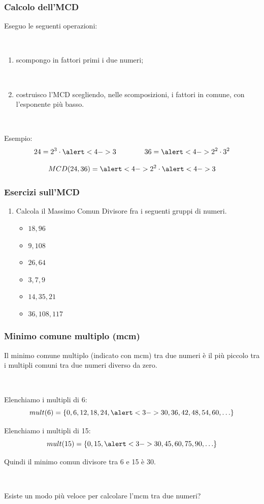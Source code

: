 \documentclass[]{beamer}
\theoremstyle{plain}
\begin{document}
\begin{frame}
\frametitle{Calcolo dell'MCD}
Eseguo le seguenti operazioni:

~

\begin{enumerate}
  \item \alert{scompongo in fattori primi} i due numeri;\pause
  
  ~
  \item costruisco l'MCD scegliendo, nelle scomposizioni, \alert{i fattori in comune, con l'esponente più basso}.\pause
\end{enumerate}

~

Esempio:\[24 = 2^3 \cdot \alert<4->{3} \qquad\qquad 36 = \alert<4->{2^2} \cdot 3^2 \]\pause

\[ MCD(24, 36) = \alert<4->{2^2} \cdot \alert<4->{3} \]
\end{frame}







\begin{frame}
  \frametitle{Esercizi sull'MCD}
  \begin{enumerate}
    \item Calcola il Massimo Comun Divisore fra i seguenti gruppi di numeri.
    \begin{multicols}{2}
      \begin{itemize}
          \item $ 18, 96 $
          \item $ 9, 108 $
          \item $ 26, 64 $
          \item $ 3, 7, 9 $
          \item $ 14, 35, 21 $
          \item $ 36, 108, 117 $
      \end{itemize}
    \end{multicols}
  \end{enumerate}
  \end{frame}
  
  





\begin{frame}
\frametitle{Minimo comune multiplo (mcm)}
Il minimo comune multiplo (indicato con mcm) tra due numeri è \alert{il più piccolo tra i multipli comuni tra due numeri} diverso da zero.\pause

~

Elenchiamo i multipli di 6:
\[mult(6) = \{ 0, 6, 12, 18, 24, \alert<3->{30}, 36, 42, 48, 54, 60, \ldots \}\]\pause

Elenchiamo i multipli di 15:
\[mult(15) = \{ 0, 15, \alert<3->{30}, 45, 60, 75, 90, \ldots \}\]\pause

Quindi il minimo comun divisore tra 6 e 15 è 30.\pause

~

Esiste un modo più veloce per calcolare l'mcm tra due numeri?
\end{frame}
\end{document}
